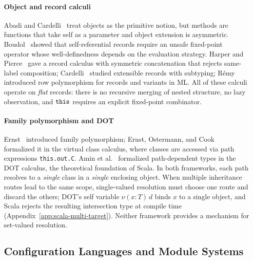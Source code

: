 \paragraph{Object and record calculi}
Abadi and Cardelli~\cite{abadi1996-theory-of-objects} treat objects as the
primitive notion, but methods are functions that take self as a
parameter and object extension is asymmetric.
Boudol~\cite{boudol2004-recursive-record-semantics} showed that self-referential
records require an unsafe fixed-point operator whose
well-definedness depends on the evaluation strategy.
Harper and Pierce~\cite{harper1991-symmetric-record-concatenation} gave a record
calculus with symmetric concatenation that rejects same-label
composition;
Cardelli~\cite{cardelli1992-extensible-records} studied extensible records
with subtyping;
R\'emy~\cite{remy1989-row-polymorphism} introduced row polymorphism for
records and variants in ML.
All of these calculi operate on \emph{flat} records: there is
no recursive merging of nested structure, no lazy observation,
and $\mathtt{this}$ requires an explicit fixed-point combinator.

\paragraph{Family polymorphism and DOT}
Ernst~\cite{ernst2001-family-polymorphism} introduced family polymorphism;
Ernst, Ostermann, and Cook~\cite{ernst2006-virtual-class-calculus}
formalized it in the virtual class calculus, where classes are
accessed via path expressions \texttt{this.out.C}.
Amin et al.~\cite{amin2016-dependent-object-types} formalized path-dependent types
in the DOT calculus, the theoretical foundation of Scala.
In both frameworks, each path resolves to a
\emph{single} class in a \emph{single} enclosing object.
When multiple inheritance routes lead to the same scope,
single-valued resolution must choose one route and discard the
others; DOT's self variable $\nu(x : T)\, d$ binds $x$ to a
single object, and Scala rejects the resulting intersection
type at compile time
(Appendix~\ref{app:scala-multi-target}).
Neither framework provides a mechanism for set-valued
resolution.

\subsection{Configuration Languages and Module Systems}


